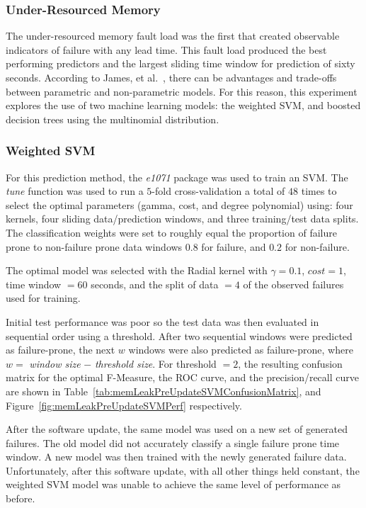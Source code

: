 \subsubsection{Under-Resourced Memory}
The under-resourced memory fault load was the first that created observable
indicators of failure with any lead time.  This fault load produced the best
performing predictors and the largest sliding time window for prediction of
sixty seconds.  According to James, et al.~\cite{islr}, there can be advantages
and trade-offs between parametric and non-parametric models.  For this reason,
this experiment explores the use of two machine learning models: the weighted
\ac{SVM}, and boosted decision trees using the multinomial distribution.  

\subsubsection{Weighted \ac{SVM}}
For this prediction method, the \emph{e1071} package was used to train an
\ac{SVM}.  The \emph{tune} function was used to run a $5$-fold cross-validation
a total of $48$ times to select the optimal parameters (gamma, cost, and degree
polynomial) using: four kernels, four sliding data/prediction windows, and
three training/test data splits.  The classification weights were set to
roughly equal the proportion of failure prone to non-failure prone data windows
$0.8$ for failure, and $0.2$ for non-failure.

The optimal model was selected with the Radial kernel with $\gamma = 0.1$,
$cost = 1$, time window $= 60$ seconds, and the split of data $= 4$ of the
observed failures used for training.

Initial test performance was poor so the test data was then evaluated in
sequential order using a threshold.  After two sequential windows were
predicted as failure-prone, the next $w$ windows were also predicted as
failure-prone, where $w = $ \emph{window size} $-$ \emph{threshold size}.  For
threshold $= 2$, the resulting confusion matrix for the optimal F-Measure, the
\ac{ROC} curve, and the precision/recall curve are shown in
Table~\ref{tab:memLeakPreUpdateSVMConfusionMatrix}, and
Figure~\ref{fig:memLeakPreUpdateSVMPerf} respectively.

\figMemLeakPreUpdateSVMPerf
\tabMemLeakPreUpdateSVMConfusionMatrix

After the software update, the same model was used on a new set of generated
failures.  The old model did not accurately classify a single failure prone
time window.  A new model was then trained with the newly generated failure
data.  Unfortunately, after this software update, with all other things held
constant, the weighted SVM model was unable to achieve the same level of
performance as before.


